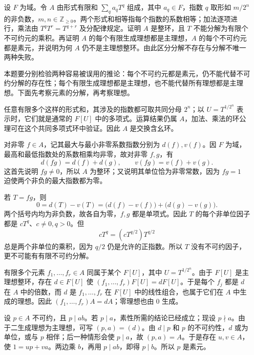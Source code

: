 \begin{exercise}\label{b1:ex:11-factorization-nonexistence}
	设 \(F\) 为域。令 \(A\) 由形式有限和 \(\sum_q a_qT^q\) 组成，其中 \(a_q\in F\)，指数 \(q\) 取形如 \(m/2^n\) 的非负数，\(m,n\in\mathbb Z_{\geq0}\)。两个形式和相等指每个指数的系数相等；加法逐项进行，乘法由 \(T^qT^r=T^{q+r}\) 及分配律规定。证明 \(A\) 是整环，且 \(T\) 不能分解为有限个不可约元的乘积。再证明 \(A\) 的每个有限生成理想都是主理想，\(A\) 的每个不可约元都是素元，并说明为何 \(A\) 仍不是主理想整环。由此区分分解不存在与分解不唯一两种失败。
\end{exercise}
\begin{solution}
	本题要分别检验两种容易被误用的推论：每个不可约元都是素元，仍不能代替不可约分解的存在性；每个有限生成理想都是主理想，也不能代替所有理想都是主理想。下面先考察元素的分解，再考察理想。

	任意有限多个这样的形式和，其涉及的指数都可取共同分母 \(2^n\)；以 \(U=T^{1/2^n}\) 表示时，它们就是通常的 \(F[U]\) 中的多项式。运算结果仍属 \(A\)，加法、乘法的环公理可在这个共同多项式环中验证。因此 \(A\) 是交换含幺环。

	对非零 \(f\in A\)，记其最大与最小非零系数指数分别为 \(d(f),v(f)\)。因 \(F\) 为域，最高和最低指数处的系数相乘均非零，故对非零 \(f,g\)，有
	\[
		d(fg)=d(f)+d(g),\qquad v(fg)=v(f)+v(g).
	\]
	这首先说明 \(fg\ne0\)，所以 \(A\) 为整环；又说明其单位恰为非零常数，因为 \(fg=1\) 迫使两个非负的最大指数都为零。

	若 \(T=fg\)，则
	\[
		0=d(T)-v(T) =\bigl(d(f)-v(f)\bigr)+\bigl(d(g)-v(g)\bigr).
	\]
	两个括号内均为非负数，故各自为零，\(f,g\) 都是单项式。因此 \(T\) 的每个非单位因子都是 \(cT^q\)、\(c\ne0,q>0\)。但
	\[
		cT^q=(cT^{q/2})T^{q/2}
	\]
	总是两个非单位的乘积，因为 \(q/2\) 仍是允许的正指数。所以 \(T\) 没有不可约因子，更不可能有有限不可约分解。

	有限多个元素 \(f_1,\ldots,f_r\in A\) 同属于某个 \(F[U]\)，其中 \(U=T^{1/2^n}\)。由于 \(F[U]\) 是主理想整环，存在 \(d\in F[U]\) 使 \((f_1,\ldots,f_r)F[U]=dF[U]\)。于是每个 \(f_j\) 都是 \(d\) 在 \(A\) 中的倍数，而 \(d\) 是 \(f_1,\ldots,f_r\) 在 \(F[U]\) 中的线性组合，也属于它们在 \(A\) 中生成的理想。因此 \((f_1,\ldots,f_r)A=dA\)；零理想也由 \(0\) 生成。

	设 \(p\in A\) 不可约，且 \(p\mid ab\)。若 \(p\mid a\)，素性所需的结论已经成立；现设 \(p\nmid a\)。由于二生成理想为主理想，可写 \((p,a)=(d)\)。由 \(d\mid p\) 和 \(p\) 的不可约性，\(d\) 或为单位，或与 \(p\) 相伴；后一种情形会使 \(p\mid a\)，故 \((p,a)=A\)。于是存在 \(u,v\in A\)，使 \(1=up+va\)。两边乘 \(b\)，再用 \(p\mid ab\)，即得 \(p\mid b\)。所以 \(p\) 是素元。


\end{solution}
